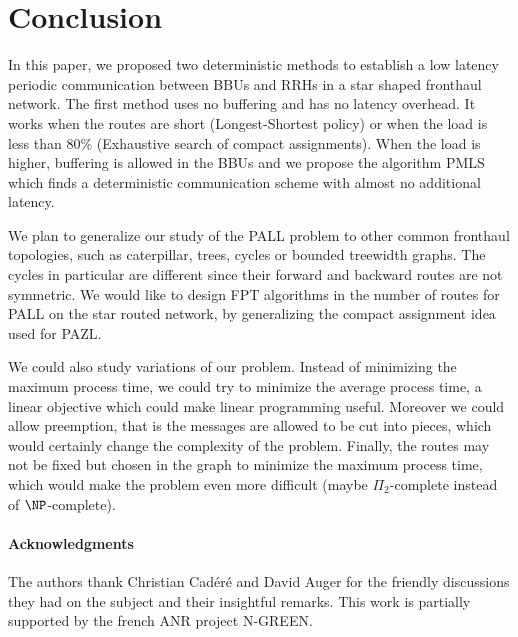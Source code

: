 \documentclass[10pt, conference, letterpaper]{IEEEtran}
\begin{document}
 \section{Conclusion}
In this paper, we proposed two deterministic methods to establish a low latency periodic communication between BBUs and RRHs in 
a star shaped fronthaul network. The first method uses no buffering and has no latency overhead. It works when the routes are short (Longest-Shortest policy) or when the load is less than $80\%$ (Exhaustive search of compact assignments).  
When the load is higher, buffering is allowed in the BBUs and we propose the algorithm PMLS which  finds a deterministic communication scheme with almost no additional latency.
% 

   
   We plan to generalize our study of the PALL problem to other common fronthaul topologies,
   such as caterpillar, trees, cycles or bounded treewidth graphs.  The cycles in particular are 
   different since their forward and backward routes are not symmetric.
   We would like to design FPT algorithms in the number of routes for PALL on the star routed network, by generalizing the compact assignment idea used for PAZL. 

   We could also study variations of our problem. Instead of minimizing the maximum process time, we could try to minimize the average process time, a linear objective which could make linear programming useful.
   Moreover we could allow preemption, that is the messages are allowed to be cut into pieces, which would certainly change the complexity of the problem. 
   Finally, the routes may not be fixed but chosen in the graph to minimize the maximum process time, which would make the problem even more difficult (maybe $\Pi_2$-complete instead of $\NP$-complete). 

  
 \paragraph*{Acknowledgments} The authors thank Christian Cad\'er\'e and David Auger for the friendly discussions
 they had on the subject and their insightful remarks. This work is partially supported by the french ANR project N-GREEN.



\end{document}
